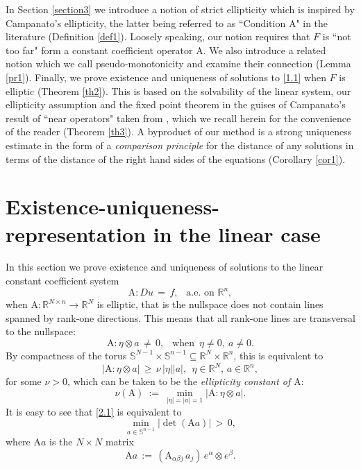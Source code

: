 \documentclass{amsart}
\theoremstyle{definition}
\numberwithin{equation}{section}
\begin{document}
In Section \ref{section3} we introduce a notion of strict ellipticity which is inspired by Campanato's ellipticity, the latter being referred to as ``Condition A" in the literature (Definition \ref{def1}). Loosely speaking, our notion requires that $F$ is ``not too far" form a constant coefficient operator ${\textrm{A}}$. We also introduce a related notion which we call pseudo-monotonicity and examine their connection (Lemma \ref{pr1}). Finally, we prove existence and uniqueness of solutions to \eqref{1.1} when $F$ is elliptic (Theorem \ref{th2}). This is based on the solvability of the linear system, our ellipticity assumption and the fixed point theorem in the guises of  Campanato's result of ``near operators" taken from \cite{C0}, which we recall herein for the convenience of the reader (Theorem \ref{th3}). A byproduct of our method is a strong uniqueness estimate in the form of a \emph{comparison  principle} for the distance of any solutions in terms of the distance of the right hand sides of the equations (Corollary \ref{cor1}).

\section{Existence-uniqueness-representation in the linear case} \label{section2}

In this section we prove existence and uniqueness of solutions to the linear constant coefficient system
\[
{\textrm{A}} : Du \,=\, f, \ \ \text{ a.e.\ on }{\mathbb{R}}^n,
\]
when ${\textrm{A}} : {\mathbb{R}}^{N {\times} n} {\longrightarrow} {\mathbb{R}}^N$ is elliptic, that is the nullspace does not contain lines spanned by rank-one directions. This means that all rank-one lines are transversal to the nullspace:
\[
{\textrm{A}}:\eta {\otimes} a \,\neq \,0, \ \ \text{ when }\,  \eta\neq 0,\ a\neq 0.
\]
By compactness of the torus ${\mathbb{S}}^{N-1}{\times} {\mathbb{S}}^{n-1} {\subseteq} {\mathbb{R}}^N {\times} {\mathbb{R}}^n$, this is equivalent to
\begin{equation} \label{2.1}
|{\textrm{A}} : \eta {\otimes} a | \,\geq \, \nu\, |\eta| |a|, \ \ \eta \in {\mathbb{R}}^N, \, a\in {\mathbb{R}}^n,
\end{equation}
for some $\nu>0$, which can be taken to be the \emph{ellipticity constant of ${\textrm{A}}$}:
\begin{equation} \label{2.1a}
\nu({\textrm{A}})\ :=\ \min_{|\eta|=|a|=1} \big|{\textrm{A}} : \eta {\otimes} a \big|. 
\end{equation}
It is easy to see that \eqref{2.1} is equivalent to
\begin{equation} \label{2.2}
\min_{a \in {\mathbb{S}}^{n-1}}\big| \det({\textrm{A}} a) \big| \, >\, 0,
\end{equation}
where ${\textrm{A}} a$ is the $N {\times} N$ matrix
\[
{\textrm{A}} a \, :=\, ({\textrm{A}}_{{\alpha} {\beta} j}\, a_j )\, e^{\alpha} {\otimes} e^{\beta}.
\]
\end{document}
